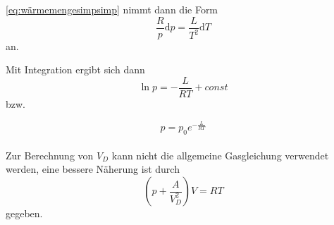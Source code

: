\eqref{eq:wärmemengesimpsimp} nimmt dann die Form
\begin{equation*}
    \frac{R}{p} \mathrm{d}p = \frac{L}{T^2} \mathrm{d}T
\end{equation*} an.

Mit Integration ergibt sich dann
\begin{equation}
    \ln p = - \frac{L}{RT} + const
    \label{eq:lnp}
\end{equation} bzw.

\begin{equation*}
    p = p_0 e^{-\frac{L}{RT}}
    \label{eq:p}
\end{equation*}\\

Zur Berechnung von $V_D$ kann nicht die allgemeine Gasgleichung verwendet werden, eine bessere
Näherung ist durch
\begin{equation}
    \left(p + \frac{A}{V^2_D}\right) V = R T
    \label{eq:approxV_D}
\end{equation} gegeben.


